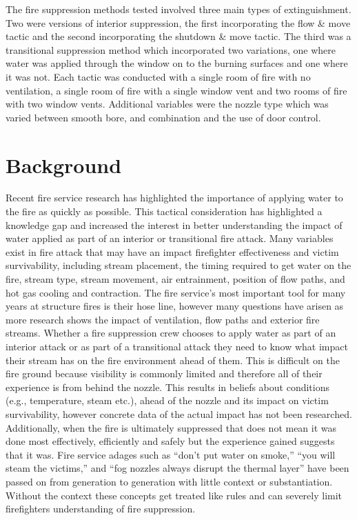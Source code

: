 \documentclass[12pt,oneside]{book}
\begin{document}
The fire suppression methods tested involved three main types of extinguishment. Two were versions of interior suppression, the first incorporating the flow \& move tactic and the second incorporating the shutdown \& move tactic. The third was a transitional suppression method which incorporated two variations, one where water was applied through the window on to the burning surfaces and one where it was not. Each tactic was conducted with a single room of fire with no ventilation, a single room of fire with a single window vent and two rooms of fire with two window vents. Additional variables were the nozzle type which was varied between smooth bore, and combination and the use of door control.

\clearpage

\chapter{Background}

Recent fire service research has highlighted the importance of applying water to the fire as quickly as possible. This tactical consideration has highlighted a knowledge gap and increased the interest in better understanding the impact of water applied as part of an interior or transitional fire attack. Many variables exist in fire attack that may have an impact firefighter effectiveness and victim survivability, including stream placement, the timing required to get water on the fire, stream type, stream movement, air entrainment, position of flow paths, and hot gas cooling and contraction. The fire service's most important tool for many years at structure fires is their hose line, however many questions have arisen as more research shows the impact of ventilation, flow paths and exterior fire streams. Whether a fire suppression crew chooses to apply water as part of an interior attack or as part of a transitional attack they need to know what impact their stream has on the fire environment ahead of them. This is difficult on the fire ground because visibility is commonly limited and therefore all of their experience is from behind the nozzle. This results in beliefs about conditions (e.g., temperature, steam etc.), ahead of the nozzle and its impact on victim survivability, however concrete data of the actual impact has not been researched. Additionally, when the fire is ultimately suppressed that does not mean it was done most effectively, efficiently and safely but the experience gained suggests that it was. Fire service adages such as ``don't put water on smoke,'' ``you will steam the victims,'' and ``fog nozzles always disrupt the thermal layer'' have been passed on from generation to generation with little context or substantiation. Without the context these concepts get treated like rules and can severely limit firefighters understanding of fire suppression.
\end{document}
